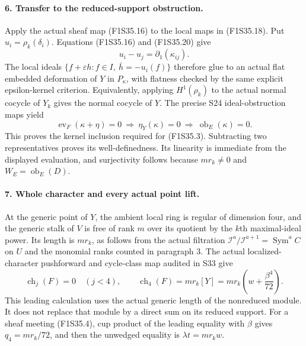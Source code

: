\paragraph{6. Transfer to the reduced-support obstruction.}
Apply the actual sheaf map (F1S35.16) to the
local maps in (F1S35.18). Put
$u_i=\rho_k(\delta_i)$.
Equations (F1S35.16) and (F1S35.20) give
\[
                       u_i-u_j=\partial_1(\kappa_{ij}).
 \tag{F1S35.21}
\]
The local ideals
$\{f+\varepsilon h:f\in I,\ \bar h=-u_i(f)\}$
therefore glue to an actual flat embedded
deformation of $Y$ in $P_\kappa$,
with flatness checked by the same explicit
epsilon-kernel criterion.
Equivalently, applying $H^1(\rho_k)$ to
the actual normal cocycle of $Y_k$ gives
the normal cocycle of $Y$.
The precise S24 ideal-obstruction maps yield
\[
 \operatorname{ev}_F(\kappa+\eta)=0
       \ \Longrightarrow\
 \eta_Y(\kappa)=0
       \ \Longrightarrow\
                         \operatorname{ob}_E(\kappa)=0.
 \tag{F1S35.22}
\]
This proves the kernel inclusion required
for (F1S35.3). Subtracting two representatives
proves its well-definedness. Its linearity
is immediate from the displayed evaluation,
and surjectivity follows because $m r_k\ne0$
and $W_E=\operatorname{ob}_E(D)$.

\paragraph{7. Whole character and every actual point lift.}
At the generic point of $Y$, the ambient
local ring is regular of dimension four,
and the generic stalk of $V$ is free of
rank $m$ over its quotient by the $k$th
maximal-ideal power. Its length is $m r_k$,
as follows from the actual filtration
$\mathcal I^a/\mathcal I^{a+1}
 =\operatorname{Sym}^a C$ on $U$
and the monomial ranks counted in paragraph 3.
The actual localized-character pushforward
and cycle-class map audited in S33 give
\[
 \operatorname{ch}_j(F)=0\quad(j<4),\qquad
 \operatorname{ch}_4(F)
        =m r_k[Y]
        =m r_k\left(w+\frac{\beta^4}{72}\right).
 \tag{F1S35.23}
\]
This leading calculation uses the actual
generic length of the nonreduced module.
It does not replace that module by a
direct sum on its reduced support.
For a sheaf meeting (F1S35.4), cup product
of the leading equality with $\beta$ gives
$q_4=m r_k/72$, and then the unwedged
equality is $\lambda t=m r_k w$.

